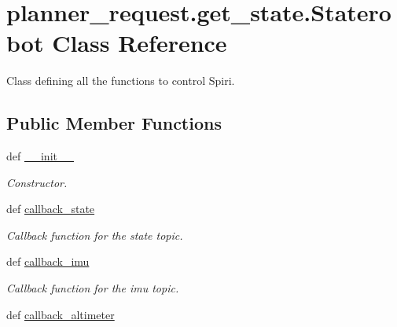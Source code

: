 \hypertarget{classplanner__request_1_1get__state_1_1_staterobot}{\section{planner\-\_\-request.\-get\-\_\-state.\-Staterobot \-Class \-Reference}
\label{classplanner__request_1_1get__state_1_1_staterobot}
}


\-Class defining all the functions to control \-Spiri.  


\subsection*{\-Public \-Member \-Functions}
\begin{DoxyCompactItemize}
\item 
def \hyperlink{classplanner__request_1_1get__state_1_1_staterobot_ae54f70c890bd5e13ceba777ca15d37ab}{\-\_\-\-\_\-init\-\_\-\-\_\-}
\begin{DoxyCompactList}\small\item\em \-Constructor. \end{DoxyCompactList}\item 
def \hyperlink{classplanner__request_1_1get__state_1_1_staterobot_a4e2342427c012e4d9f6ed238a22c46af}{callback\-\_\-state}
\begin{DoxyCompactList}\small\item\em \-Callback function for the state topic. \end{DoxyCompactList}\item 
\hypertarget{classplanner__request_1_1get__state_1_1_staterobot_a9fccc00006b0437ff039020981cfb75e}{def \hyperlink{classplanner__request_1_1get__state_1_1_staterobot_a9fccc00006b0437ff039020981cfb75e}{callback\-\_\-imu}}\label{classplanner__request_1_1get__state_1_1_staterobot_a9fccc00006b0437ff039020981cfb75e}

\begin{DoxyCompactList}\small\item\em \-Callback function for the imu topic. \end{DoxyCompactList}\item 
\hypertarget{classplanner__request_1_1get__state_1_1_staterobot_a5876c51c1f3dcaa7c82566a2f8c72ef3}{def \hyperlink{classplanner__request_1_1get__state_1_1_staterobot_a5876c51c1f3dcaa7c82566a2f8c72ef3}{callback\-\_\-altimeter}}\label{classplanner__request_1_1get__state_1_1_staterobot_a5876c51c1f3dcaa7c82566a2f8c72ef3}


\end{DoxyCompactItemize}
